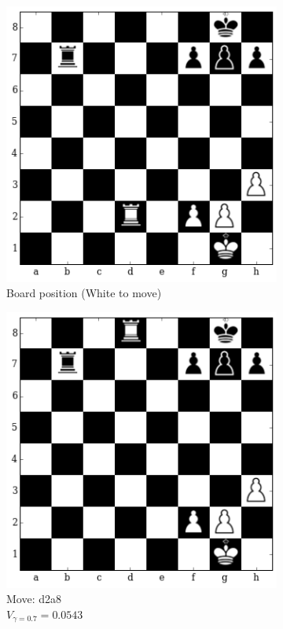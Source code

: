 \begin{figure}[H]
\vspace{-0.2in}
\hspace*{-0.5in}  
  \centering
    \begin{subfigure}[t]{\textwidth}
        \centering
        \includegraphics[scale=0.55]{img/table_evaluations/output_12_0.png}
        \caption{Board position (White to move)}
    \end{subfigure}%

 \hspace*{-0.5in}  
    \begin{subfigure}[t]{0.45\textwidth}
        \centering
        
    \includegraphics[width=\textwidth]{img/table_evaluations/output_12_2.png}
        \caption{Move: d2a8\\
        $V_{\gamma=0.7}=0.0543$}
    \end{subfigure}
   \hspace{1em}
  \centering
    \begin{subfigure}[t]{0.45\textwidth}
        \centering
        

\end{subfigure}
\end{figure}
